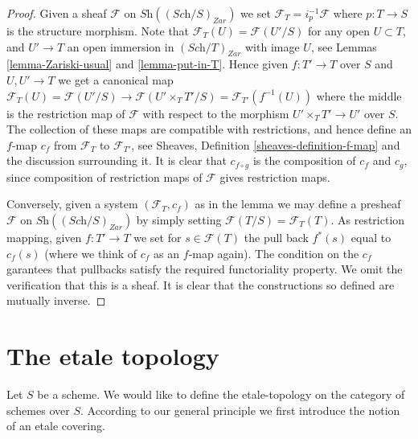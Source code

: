 \begin{proof}
Given a sheaf $\mathcal{F}$ on $\textit{Sh}((\textit{Sch}/S)_{Zar})$
we set $\mathcal{F}_T = i_p^{-1}\mathcal{F}$ where $p : T \to S$
is the structure morphism. Note that
$\mathcal{F}_T(U) = \mathcal{F}(U'/S)$ for any open $U \subset T$,
and $U' \to T$ an open immersion in $(\textit{Sch}/T)_{Zar}$
with image $U$, see Lemmas \ref{lemma-Zariski-usual} and \ref{lemma-put-in-T}.
Hence given $f : T' \to T$ over $S$ and $U, U' \to T$ we get a canonical
map $\mathcal{F}_T(U) = \mathcal{F}(U'/S) \to \mathcal{F}(U'\times_TT'/S)
= \mathcal{F}_{T'}(f^{-1}(U))$ where the middle is the restriction map
of $\mathcal{F}$ with respect to the morphism
$U' \times_TT' \to U'$ over $S$. The collection of these maps are
compatible with restrictions, and hence define an $f$-map $c_f$
from $\mathcal{F}_T$ to $\mathcal{F}_{T'}$, see
Sheaves, Definition \ref{sheaves-definition-f-map} and the discussion
surrounding it. It is clear that $c_{f \circ g}$ is the composition of
$c_f$ and $c_g$, since composition of restriction maps of $\mathcal{F}$
gives restriction maps.

\medskip\noindent
Conversely, given a system $(\mathcal{F}_T, c_f)$ as in the lemma
we may define a presheaf $\mathcal{F}$ on $\textit{Sh}((\textit{Sch}/S)_{Zar})$
by simply setting $\mathcal{F}(T/S) = \mathcal{F}_T(T)$. As restriction
mapping, given $f : T' \to T$ we set for $s \in \mathcal{F}(T)$
the pull back $f^*(s)$ equal to $c_f(s)$ (where we think of $c_f$ as
an $f$-map again). The condition on the $c_f$ garantees that
pullbacks satisfy the required functoriality property.
We omit the verification that this is a sheaf.
It is clear that the constructions so defined are mutually inverse.
\end{proof}























\section{The etale topology}
\label{section-etale}

\noindent
Let $S$ be a scheme. We would like to define the etale-topology on
the category of schemes over $S$. According to our general principle
we first introduce the notion of an etale covering.

